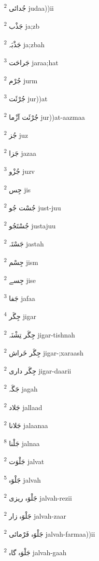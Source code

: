 \documentclass[12pt]{article}
\begin{document}
\begin{multicols}{5}
{\ur جُدائی}   \textsuperscript{2} judaa))ii

{\ur جَذْب}   \textsuperscript{2} ja;zb

{\ur جَذْبَہ}   \textsuperscript{2} ja;zbah

{\ur جَراحَت}   \textsuperscript{3} jaraa;hat

{\ur جُرْم}   \textsuperscript{2} jurm

{\ur جُرْئَت}   \textsuperscript{3} jur))at

{\ur جُرْئَت آزْما}   \textsuperscript{2} jur))at-aazmaa

{\ur جُز}   \textsuperscript{2} juz

{\ur جَزا}   \textsuperscript{2} jazaa

{\ur جُزْو}   \textsuperscript{3} juzv

{\ur جِس}   \textsuperscript{2} jis

{\ur جُسْت جُو}   \textsuperscript{2} just-juu

{\ur جُسْتَجُو}   \textsuperscript{2} justajuu

{\ur جَسْتَہ}   \textsuperscript{2} jastah

{\ur جِسْم}   \textsuperscript{2} jism

{\ur جِسے}   \textsuperscript{2} jise

{\ur جَفا}   \textsuperscript{3} jafaa

{\ur جِگَر}   \textsuperscript{4} jigar

{\ur جِگَر تِشْنَہ}   \textsuperscript{2} jigar-tishnah

{\ur جِگَر خَراش}   \textsuperscript{2} jigar-;xaraash

{\ur جِگَر داری}   \textsuperscript{2} jigar-daarii

{\ur جَگَہ}   \textsuperscript{2} jagah

{\ur جَلاد}   \textsuperscript{2} jallaad

{\ur جَلانا}   \textsuperscript{2} jalaanaa

{\ur جَلْنا}   \textsuperscript{8} jalnaa

{\ur جَلْوَت}   \textsuperscript{2} jalvat

{\ur جَلْوَہ}   \textsuperscript{5} jalvah

{\ur جَلْوَہ ریزی}   \textsuperscript{2} jalvah-rezii

{\ur جَلْوَہ زار}   \textsuperscript{2} jalvah-zaar

{\ur جَلْوَہ فَرْمائی}   \textsuperscript{2} jalvah-farmaa))ii

{\ur جَلْوَہ گاہ}   \textsuperscript{2} jalvah-gaah


\end{multicols}
\end{document}
